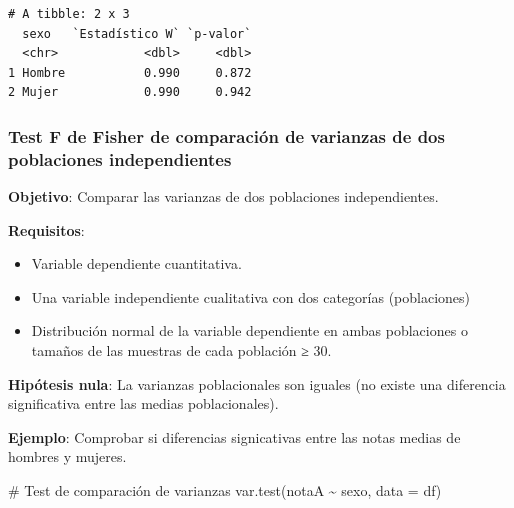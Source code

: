 \documentclass[
  a4paper,
]{scrreport}
\newenvironment{Shaded}{\begin{snugshade}}{\end{snugshade}}
\newcommand{\AttributeTok}[1]{\textcolor[rgb]{0.40,0.45,0.13}{#1}}
\newcommand{\CommentTok}[1]{\textcolor[rgb]{0.37,0.37,0.37}{#1}}
\newcommand{\FunctionTok}[1]{\textcolor[rgb]{0.28,0.35,0.67}{#1}}
\newcommand{\NormalTok}[1]{\textcolor[rgb]{0.00,0.23,0.31}{#1}}
\newcommand{\OtherTok}[1]{\textcolor[rgb]{0.00,0.23,0.31}{#1}}
\newcommand{\SpecialCharTok}[1]{\textcolor[rgb]{0.37,0.37,0.37}{#1}}
\newcommand{\StringTok}[1]{\textcolor[rgb]{0.13,0.47,0.30}{#1}}
\providecommand{\tightlist}{%
  \setlength{\itemsep}{0pt}\setlength{\parskip}{0pt}}\usepackage{longtable,booktabs,array}
\theoremstyle{definition}
\theoremstyle{definition}
\theoremstyle{remark}
\begin{document}
\begin{Shaded}
\end{Shaded}

\begin{verbatim}
# A tibble: 2 x 3
  sexo   `Estadístico W` `p-valor`
  <chr>            <dbl>     <dbl>
1 Hombre           0.990     0.872
2 Mujer            0.990     0.942
\end{verbatim}

\subsubsection{Test F de Fisher de comparación de varianzas de dos
poblaciones
independientes}\label{test-f-de-fisher-de-comparaciuxf3n-de-varianzas-de-dos-poblaciones-independientes}

\textbf{Objetivo}: Comparar las varianzas de dos poblaciones
independientes.

\textbf{Requisitos}:

\begin{itemize}
\tightlist
\item
  Variable dependiente cuantitativa.
\item
  Una variable independiente cualitativa con dos categorías
  (poblaciones)
\item
  Distribución normal de la variable dependiente en ambas poblaciones o
  tamaños de las muestras de cada población ≥ 30.
\end{itemize}

\textbf{Hipótesis nula}: La varianzas poblacionales son iguales (no
existe una diferencia significativa entre las medias poblacionales).

\textbf{Ejemplo}: Comprobar si diferencias signicativas entre las notas
medias de hombres y mujeres.

\begin{Shaded}
\begin{Highlighting}[]
\CommentTok{\# Test de comparación de varianzas}
\FunctionTok{var.test}\NormalTok{(notaA }\SpecialCharTok{\textasciitilde{}}\NormalTok{ sexo, }\AttributeTok{data =}\NormalTok{ df)}
\end{Highlighting}
\end{Shaded}
\end{document}
